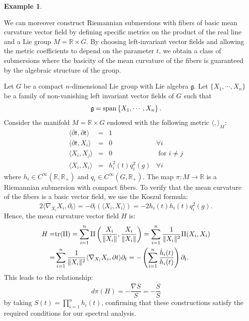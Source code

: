 \documentclass{amsart}
\theoremstyle{definition}
\newtheorem{example}[theorem]{Example}
\theoremstyle{remark}
\numberwithin{equation}{section}
\begin{document}
\begin{example}
\begin{enumerate}
We can moreover construct Riemannian submersions with fibers of basic mean curvature vector field by defining specific metrics on the product of the real line and a Lie group $M=\mathbb{R}\times G$. By choosing left-invariant vector fields and allowing the metric coefficients to depend on the parameter $t$, we obtain a class of submersions where the basicity of the mean curvature of the fibers is guaranteed by the algebraic structure of the group.

Let $G$ be a compact $n$-dimensional Lie group with Lie algebra $\mathfrak{g}$. Let $\{X_1,\cdots, X_n\}$ be a family of non-vanishing left invariant vector fields of $G$ such that
$$
\mathfrak{g}={\rm span}\left\{X_1,\cdots,X_n\right\}.
$$
Consider the manifold $M=\mathbb{R}\times G$ endowed with the following metric $\langle,\rangle_M$:
$$\begin{array}{lclr}
\langle \partial t,\partial t\rangle&=&1& \\
\langle \partial t,X_i\rangle&=&0& \forall i\\
\langle X_i,X_j\rangle&=&0 & \text{ for } i\neq j\\
\langle X_i,X_i\rangle&=&h^2_i(t)q^2_i(g)& \forall i
\end{array}
$$
where $h_i\in C^{\infty}(\mathbb{R},\mathbb{R}_+)$ and $q_i\in C^{\infty}(G,\mathbb{R}_+)$. The map $\pi:M\to \mathbb{R}$ is a Riemannian submersion with compact fibers. To verify that the mean curvature of the fibers is a basic vector field, we use the Koszul formula:
 $$
 2\langle \nabla_{X_i}X_i,\partial_t\rangle=-\partial_t\left(\langle X_i,X_i\rangle\right)=-2h_i(t)\dot h_i(t) q_i^2(g).
 $$
Hence, the mean curvature vector field $H$ is:
 $$
 \begin{aligned}
 H=&{\rm tr}(\mathrm{II})=\sum_{i=1}^n\mathrm{II}\left(\frac{X_i}{\Vert X_i\Vert},\frac{X_i}{\Vert X_i\Vert}\right)=\sum_{i=1}^n\frac{1}{\Vert X_i\Vert^2}\mathrm{II}(X_i,X_i)\\
 =&\sum_{i=1}^n\frac{1}{\Vert X_i\Vert^2}\langle \nabla_{X_i}X_i,\partial t\rangle \partial_t=-\left(\sum_{i=1}^n\frac{\dot h_i(t)}{h_i(t)}\right)\partial_t .
 \end{aligned}
$$
This leads to the relationship:
 $$
d\pi(H)=-\frac{\nabla S}{S}=-\frac{\dot S}{S}
$$
by taking $S(t)=\prod_{i=1}^nh_i(t)$, confirming that these constructions satisfy the required conditions for our spectral analysis.
\end{enumerate} 
\end{example}
\end{document}
